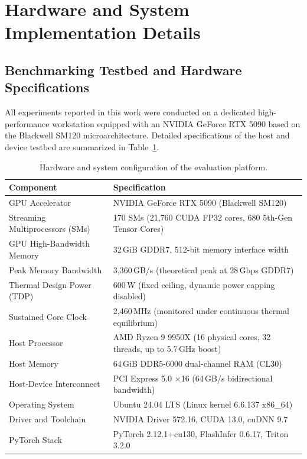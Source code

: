 \documentclass{article}
\begin{document}



\clearpage
\appendix
\onecolumn

\section{Hardware and System Implementation Details}
\label{app:hardware}

\subsection{Benchmarking Testbed and Hardware Specifications}
All experiments reported in this work were conducted on a dedicated high-performance workstation equipped with an NVIDIA GeForce RTX 5090 based on the Blackwell SM120 microarchitecture. Detailed specifications of the host and device testbed are summarized in Table~\ref{tab:hardware_specs}.

\begin{table}[h]
\caption{Hardware and system configuration of the evaluation platform.}
\label{tab:hardware_specs}
\centering\small
\begin{tabular}{ll}
\toprule
Component & Specification \\
\midrule
GPU Accelerator & NVIDIA GeForce RTX 5090 (Blackwell SM120) \\
Streaming Multiprocessors (SMs) & 170 SMs (21,760 CUDA FP32 cores, 680 5th-Gen Tensor Cores) \\
GPU High-Bandwidth Memory & 32\,GiB GDDR7, 512-bit memory interface width \\
Peak Memory Bandwidth & 3,360\,GB/s (theoretical peak at 28\,Gbps GDDR7) \\
Thermal Design Power (TDP) & 600\,W (fixed ceiling, dynamic power capping disabled) \\
Sustained Core Clock & 2,460\,MHz (monitored under continuous thermal equilibrium) \\
Host Processor & AMD Ryzen 9 9950X (16 physical cores, 32 threads, up to 5.7\,GHz boost) \\
Host Memory & 64\,GiB DDR5-6000 dual-channel RAM (CL30) \\
Host-Device Interconnect & PCI Express 5.0 $\times$16 (64\,GB/s bidirectional bandwidth) \\
Operating System & Ubuntu 24.04 LTS (Linux kernel 6.6.137 x86\_64) \\
Driver and Toolchain & NVIDIA Driver 572.16, CUDA 13.0, cuDNN 9.7 \\
PyTorch Stack & PyTorch 2.12.1+cu130, FlashInfer 0.6.17, Triton 3.2.0 \\
\bottomrule
\end{tabular}
\end{table}
\end{document}
